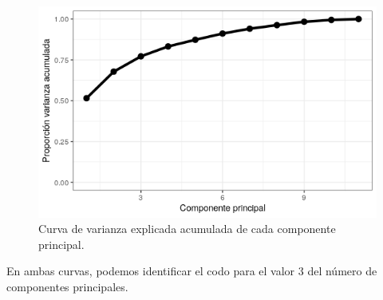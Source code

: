 \documentclass[12pt]{article}
\begin{document}
\begin{figure}[H]
  \centering
  \includegraphics[width=120mm]{elbow-cumsum}
  \caption{Curva de varianza explicada acumulada de cada componente
    principal.}
\end{figure}

En ambas curvas, podemos identificar el codo para el valor 3 del
número de componentes principales.
\end{document}
